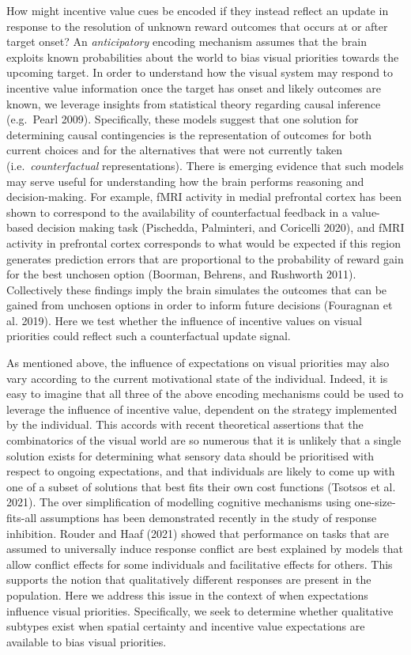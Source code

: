 \documentclass[11pt,halfline,a4paper,]{ouparticle}
\begin{document}
How might incentive value cues be encoded if they instead reflect an update in response to the resolution of unknown reward outcomes that occurs at or after target onset? An \emph{anticipatory} encoding mechanism assumes that the brain exploits known probabilities about the world to bias visual priorities towards the upcoming target. In order to understand how the visual system may respond to incentive value information once the target has onset and likely outcomes are known, we leverage insights from statistical theory regarding causal inference (e.g.~Pearl 2009). Specifically, these models suggest that one solution for determining causal contingencies is the representation of outcomes for both current choices and for the alternatives that were not currently taken (i.e.~\emph{counterfactual} representations). There is emerging evidence that such models may serve useful for understanding how the brain performs reasoning and decision-making. For example, fMRI activity in medial prefrontal cortex has been shown to correspond to the availability of counterfactual feedback in a value-based decision making task (Pischedda, Palminteri, and Coricelli 2020), and fMRI activity in prefrontal cortex corresponds to what would be expected if this region generates prediction errors that are proportional to the probability of reward gain for the best unchosen option (Boorman, Behrens, and Rushworth 2011). Collectively these findings imply the brain simulates the outcomes that can be gained from unchosen options in order to inform future decisions (Fouragnan et al. 2019). Here we test whether the influence of incentive values on visual priorities could reflect such a counterfactual update signal.

As mentioned above, the influence of expectations on visual priorities may also vary according to the current motivational state of the individual. Indeed, it is easy to imagine that all three of the above encoding mechanisms could be used to leverage the influence of incentive value, dependent on the strategy implemented by the individual. This accords with recent theoretical assertions that the combinatorics of the visual world are so numerous that it is unlikely that a single solution exists for determining what sensory data should be prioritised with respect to ongoing expectations, and that individuals are likely to come up with one of a subset of solutions that best fits their own cost functions (Tsotsos et al. 2021). The over simplification of modelling cognitive mechanisms using one-size-fits-all assumptions has been demonstrated recently in the study of response inhibition. Rouder and Haaf (2021) showed that performance on tasks that are assumed to universally induce response conflict are best explained by models that allow conflict effects for some individuals and facilitative effects for others. This supports the notion that qualitatively different responses are present in the population. Here we address this issue in the context of when expectations influence visual priorities. Specifically, we seek to determine whether qualitative subtypes exist when spatial certainty and incentive value expectations are available to bias visual priorities.
\end{document}
